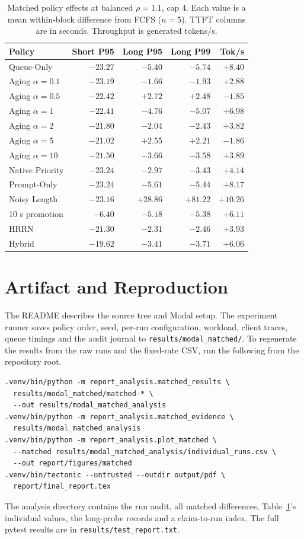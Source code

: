 \documentclass[sigplan,nonacm]{acmart}
\begin{document}
\begin{table}[H]
\centering
\caption{Matched policy effects at balanced $\rho=1.1$, cap 4.
Each value is a mean within-block difference from FCFS ($n=5$).
TTFT columns are in seconds. Throughput is generated tokens/s.}
\label{tab:variants}
\small
\setlength{\tabcolsep}{3pt}
\begin{tabular}{@{}lrrrr@{}}
\toprule
Policy & Short P95 & Long P95 & Long P99 & Tok/s \\
\midrule
Queue-Only & $-23.27$ & $-5.40$ & $-5.74$ & $+8.40$ \\
Aging $\alpha=0.1$ & $-23.19$ & $-1.66$ & $-1.93$ & $+2.88$ \\
Aging $\alpha=0.5$ & $-22.42$ & $+2.72$ & $+2.48$ & $-1.85$ \\
Aging $\alpha=1$ & $-22.41$ & $-4.76$ & $-5.07$ & $+6.98$ \\
Aging $\alpha=2$ & $-21.80$ & $-2.04$ & $-2.43$ & $+3.82$ \\
Aging $\alpha=5$ & $-21.02$ & $+2.55$ & $+2.21$ & $-1.86$ \\
Aging $\alpha=10$ & $-21.50$ & $-3.66$ & $-3.58$ & $+3.89$ \\
Native Priority & $-23.24$ & $-2.97$ & $-3.43$ & $+4.14$ \\
Prompt-Only & $-23.24$ & $-5.61$ & $-5.44$ & $+8.17$ \\
Noisy Length & $-23.16$ & $+28.86$ & $+81.22$ & $+10.26$ \\
10 s promotion & $-6.40$ & $-5.18$ & $-5.38$ & $+6.11$ \\
HRRN & $-21.30$ & $-2.31$ & $-2.46$ & $+3.93$ \\
Hybrid & $-19.62$ & $-3.41$ & $-3.71$ & $+6.06$ \\
\bottomrule
\end{tabular}
\end{table}

\section{Artifact and Reproduction}
\label{app:artifact}

The README describes the source tree and Modal setup. The experiment
runner saves policy order, seed, per-run configuration, workload,
client traces, queue timings and the audit journal to
\texttt{results/modal\_matched/}. To regenerate the results from the raw
runs and the fixed-rate CSV, run the following from the repository root.
\begin{lstlisting}
.venv/bin/python -m report_analysis.matched_results \
  results/modal_matched/matched-* \
  --out results/modal_matched_analysis
.venv/bin/python -m report_analysis.matched_evidence \
  results/modal_matched_analysis
.venv/bin/python -m report_analysis.plot_matched \
  --matched results/modal_matched_analysis/individual_runs.csv \
  --out report/figures/matched
.venv/bin/tectonic --untrusted --outdir output/pdf \
  report/final_report.tex
\end{lstlisting}
The analysis directory contains the run audit, all matched
differences, Table~\ref{tab:variants}'s individual values, the long-probe
records and a claim-to-run index. The full pytest results are in
\texttt{results/test\_report.txt}.
\end{document}
